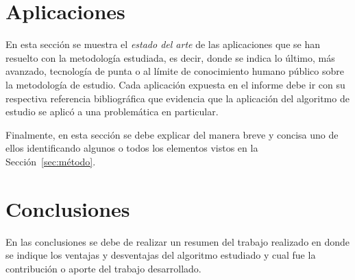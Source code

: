 \documentclass[journal]{IEEEtran}
\begin{document}
\section{Aplicaciones} \label{sec:aplicaciones}
En esta sección se muestra el \textit{estado del arte} de las aplicaciones que se han resuelto con la metodología estudiada, es decir, donde se indica lo último, más avanzado, tecnología de punta o al límite de conocimiento humano público sobre la metodología de estudio. Cada aplicación expuesta en el informe debe ir con su respectiva referencia bibliográfica que evidencia que la aplicación del algoritmo de estudio se aplicó a una problemática en particular.

Finalmente, en esta sección se debe explicar del manera breve y concisa uno de ellos identificando algunos o todos los elementos vistos en la Sección~\ref{sec:método}.


\section{Conclusiones} \label{sec:conclusiones}
En las conclusiones se  debe de realizar un resumen del trabajo realizado en donde se indique los ventajas y desventajas del algoritmo estudiado y cual fue la contribución o aporte del trabajo desarrollado.




\end{document}
